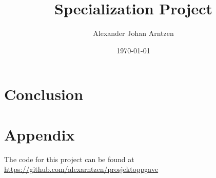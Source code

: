 \documentclass{article}
\title{Specialization Project}
\author{Alexander Johan Arntzen }
\date{\today}
\begin{document}
\maketitle
\tableofcontents







\FloatBarrier

\section{Conclusion}



\section*{Appendix}
The code for this project can be found at \url{https://github.com/alexarntzen/prosjektoppgave}


\printbibliography
\end{document}
